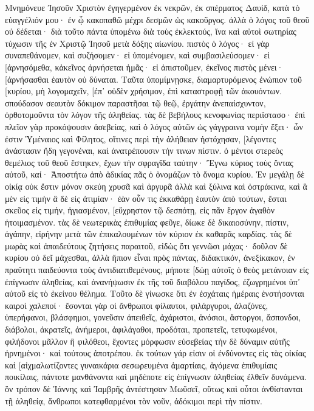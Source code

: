 Μνημόνευε Ἰησοῦν Χριστὸν ἐγηγερμένον ἐκ νεκρῶν, ἐκ σπέρματος Δαυίδ, κατὰ τὸ εὐαγγέλιόν μου· 
ἐν ᾧ κακοπαθῶ μέχρι δεσμῶν ὡς κακοῦργος. ἀλλὰ ὁ λόγος τοῦ θεοῦ οὐ δέδεται· 
διὰ τοῦτο πάντα ὑπομένω διὰ τοὺς ἐκλεκτούς, ἵνα καὶ αὐτοὶ σωτηρίας τύχωσιν τῆς ἐν Χριστῷ Ἰησοῦ μετὰ δόξης αἰωνίου. 
πιστὸς ὁ λόγος· εἰ γὰρ συναπεθάνομεν, καὶ συζήσομεν· 
εἰ ὑπομένομεν, καὶ συμβασιλεύσομεν· εἰ [ἀρνησόμεθα, κἀκεῖνος ἀρνήσεται ἡμᾶς· 
εἰ ἀπιστοῦμεν, ἐκεῖνος πιστὸς μένει· [ἀρνήσασθαι ἑαυτὸν οὐ δύναται. 
Ταῦτα ὑπομίμνῃσκε, διαμαρτυρόμενος ἐνώπιον τοῦ [κυρίου, μὴ λογομαχεῖν, [ἐπ᾽ οὐδὲν χρήσιμον, ἐπὶ καταστροφῇ τῶν ἀκουόντων. 
σπούδασον σεαυτὸν δόκιμον παραστῆσαι τῷ θεῷ, ἐργάτην ἀνεπαίσχυντον, ὀρθοτομοῦντα τὸν λόγον τῆς ἀληθείας. 
τὰς δὲ βεβήλους κενοφωνίας περιΐστασο· ἐπὶ πλεῖον γὰρ προκόψουσιν ἀσεβείας, 
καὶ ὁ λόγος αὐτῶν ὡς γάγγραινα νομὴν ἕξει· ὧν ἐστιν Ὑμέναιος καὶ Φίλητος, 
οἵτινες περὶ τὴν ἀλήθειαν ἠστόχησαν, [λέγοντες ἀνάστασιν ἤδη γεγονέναι, καὶ ἀνατρέπουσιν τήν τινων πίστιν. 
ὁ μέντοι στερεὸς θεμέλιος τοῦ θεοῦ ἕστηκεν, ἔχων τὴν σφραγῖδα ταύτην· Ἔγνω κύριος τοὺς ὄντας αὐτοῦ, καί· Ἀποστήτω ἀπὸ ἀδικίας πᾶς ὁ ὀνομάζων τὸ ὄνομα κυρίου. 
Ἐν μεγάλῃ δὲ οἰκίᾳ οὐκ ἔστιν μόνον σκεύη χρυσᾶ καὶ ἀργυρᾶ ἀλλὰ καὶ ξύλινα καὶ ὀστράκινα, καὶ ἃ μὲν εἰς τιμὴν ἃ δὲ εἰς ἀτιμίαν· 
ἐὰν οὖν τις ἐκκαθάρῃ ἑαυτὸν ἀπὸ τούτων, ἔσται σκεῦος εἰς τιμήν, ἡγιασμένον, [εὔχρηστον τῷ δεσπότῃ, εἰς πᾶν ἔργον ἀγαθὸν ἡτοιμασμένον. 
τὰς δὲ νεωτερικὰς ἐπιθυμίας φεῦγε, δίωκε δὲ δικαιοσύνην, πίστιν, ἀγάπην, εἰρήνην μετὰ τῶν ἐπικαλουμένων τὸν κύριον ἐκ καθαρᾶς καρδίας. 
τὰς δὲ μωρὰς καὶ ἀπαιδεύτους ζητήσεις παραιτοῦ, εἰδὼς ὅτι γεννῶσι μάχας· 
δοῦλον δὲ κυρίου οὐ δεῖ μάχεσθαι, ἀλλὰ ἤπιον εἶναι πρὸς πάντας, διδακτικόν, ἀνεξίκακον, 
ἐν πραΰτητι παιδεύοντα τοὺς ἀντιδιατιθεμένους, μήποτε [δώῃ αὐτοῖς ὁ θεὸς μετάνοιαν εἰς ἐπίγνωσιν ἀληθείας, 
καὶ ἀνανήψωσιν ἐκ τῆς τοῦ διαβόλου παγίδος, ἐζωγρημένοι ὑπ᾽ αὐτοῦ εἰς τὸ ἐκείνου θέλημα. 
Τοῦτο δὲ γίνωσκε ὅτι ἐν ἐσχάταις ἡμέραις ἐνστήσονται καιροὶ χαλεποί· 
ἔσονται γὰρ οἱ ἄνθρωποι φίλαυτοι, φιλάργυροι, ἀλαζόνες, ὑπερήφανοι, βλάσφημοι, γονεῦσιν ἀπειθεῖς, ἀχάριστοι, ἀνόσιοι, 
ἄστοργοι, ἄσπονδοι, διάβολοι, ἀκρατεῖς, ἀνήμεροι, ἀφιλάγαθοι, 
προδόται, προπετεῖς, τετυφωμένοι, φιλήδονοι μᾶλλον ἢ φιλόθεοι, 
ἔχοντες μόρφωσιν εὐσεβείας τὴν δὲ δύναμιν αὐτῆς ἠρνημένοι· καὶ τούτους ἀποτρέπου. 
ἐκ τούτων γάρ εἰσιν οἱ ἐνδύνοντες εἰς τὰς οἰκίας καὶ [αἰχμαλωτίζοντες γυναικάρια σεσωρευμένα ἁμαρτίαις, ἀγόμενα ἐπιθυμίαις ποικίλαις, 
πάντοτε μανθάνοντα καὶ μηδέποτε εἰς ἐπίγνωσιν ἀληθείας ἐλθεῖν δυνάμενα. 
ὃν τρόπον δὲ Ἰάννης καὶ Ἰαμβρῆς ἀντέστησαν Μωϋσεῖ, οὕτως καὶ οὗτοι ἀνθίστανται τῇ ἀληθείᾳ, ἄνθρωποι κατεφθαρμένοι τὸν νοῦν, ἀδόκιμοι περὶ τὴν πίστιν. 
